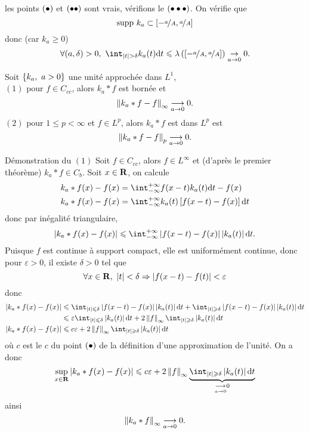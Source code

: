 \documentclass[a4paper,11pt, twoside]{article}
\begin{document}
les points $(\bullet)$ et $(\bullet\bullet)$ sont vrais, vérifions le $(\bullet\bullet\bullet)$. On vérifie que 
$$\mathrm{supp}\ k_a\subset \left[-\nicefrac{a}{A},\nicefrac{a}{A}\right]$$
donc (car $k_a\geqslant 0$)
$$\forall (a,\delta)>0,\ \int_{\abs t>\delta}k_a(t)\dt\leqslant \lambda\Par{\left[-\nicefrac{a}{A},\nicefrac{a}{A}\right]}\underset{a\to0}{\rightarrow}0.$$



\begin{prop}
  Soit $\left\{k_a,\ a>0\right\}$ une unité approchée dans $L^1$,\\

  $(\mathit 1)$ pour $f\in C_{cc}$, alors $k_a*f$ est bornée et 
  $$\left\lVert k_a*f-f\right\rVert_{\infty}\underset{a\to 0}{\longrightarrow}0.$$
  $(\mathit 2)$ pour $1\leqslant p<\infty$ et $f\in L^p$, alors $k_a*f$ est dans $L^p$ est 
  $$\left\lVert k_a*f-f\right\rVert_{p}\underset{a\to 0}{\longrightarrow}0.$$
\end{prop}


\begin{ProofC}{Démonstration du $(\mathit 1)$}
  Soit $f\in C_{cc}$, alors $f\in L^\infty$ et (d'après le premier théorème) $k_a*f\in C_b$. Soit $x\in\mathbf R$, on calcule
  \begin{align*}
    k_a*f(x)-f(x)&=\intr f(x-t)k_a(t)\dt-f(x)\\
    k_a*f(x)-f(x)&=\intr k_a(t)\left[f(x-t)-f(x)\right]\dt
  \end{align*}
  donc par inégalité triangulaire,
  $$\abs{k_a*f(x)-f(x)}\leqslant\intr\abs{f(x-t)-f(x)}\abs{k_a(t)}\dt.$$
  Puisque $f$ est continue à support compact, elle est uniformément continue, donc pour $\varepsilon>0$, il existe $\delta>0$ tel que 
  $$\forall x\in\mathbf R,\ \left| t\right|<\delta\Rightarrow\left| f(x-t)-f(t)\right|<\varepsilon$$
  donc
  \begin{align*}
    \abs{k_a*f(x)-f(x)}&\leqslant\int_{\abs t\leqslant \delta}\abs{f(x-t)-f(x)}\abs{k_a(t)}\dt+\int_{\abs t\geqslant \delta}\abs{f(x-t)-f(x)}\abs{k_a(t)}\dt\\
    &\leqslant \varepsilon\int_{\abs t\leqslant \delta}\abs{k_a(t)}\dt+2\norm{f}_\infty\int_{\abs t\geqslant\delta}\abs{k_a(t)}\dt\\
    \abs{k_a*f(x)-f(x)}&\leqslant c\varepsilon+2\norm{f}_\infty\int_{\abs t\geqslant\delta}\abs{k_a(t)}\dt\\
  \end{align*}
  où $c$ est le $c$ du point $(\bullet)$ de la définition d'une approximation de l'unité. On a donc
  $$\underset{x\in\R}{\mathrm{sup}}\abs{k_a*f(x)-f(x)}\leqslant c\varepsilon +2\norm{f}_\infty\underbrace{\int_{\abs t\geqslant\delta}\abs{k_a(t)}\dt}_{\underset{a\to 0}{\longrightarrow}0}$$
  ainsi
  $$\left\lVert k_a*f\right\rVert_{\infty}\underset{a\to 0}{\longrightarrow}0.$$
\end{ProofC}
\end{document}
